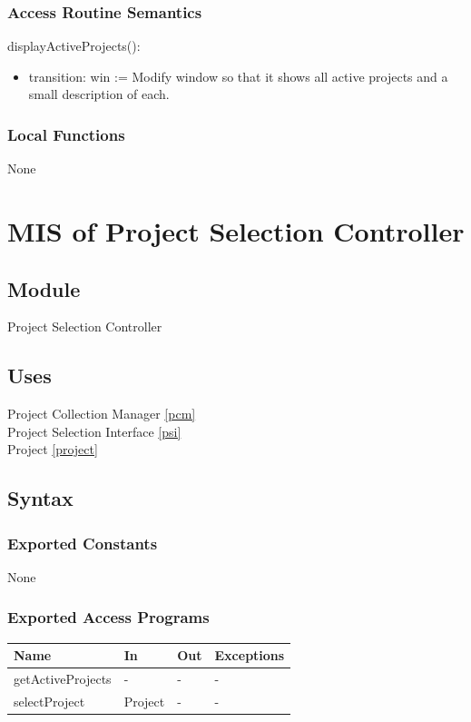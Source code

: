 \documentclass[12pt, titlepage]{article}
\begin{document}
\subsubsection{Access Routine Semantics}

\noindent displayActiveProjects():
\begin{itemize}
\item transition: win := Modify window so that it shows all active projects and a small description of each.
\end{itemize}

\subsubsection{Local Functions}
None

\section{MIS of Project Selection Controller} \label{psc}

\subsection{Module}

Project Selection Controller

\subsection{Uses}

Project Collection Manager \ref{pcm}\\
Project Selection Interface \ref{psi}\\
Project \ref{project} \\

\subsection{Syntax}

\subsubsection{Exported Constants}
None
\subsubsection{Exported Access Programs}

\begin{center}
\begin{tabular}{p{4cm} p{4cm} p{4cm} p{2cm}}
\hline
\textbf{Name} & \textbf{In} & \textbf{Out} & \textbf{Exceptions} \\
\hline
getActiveProjects & - & - & - \\
selectProject & Project & - & - \\
\hline
\end{tabular}
\end{center}
\end{document}
